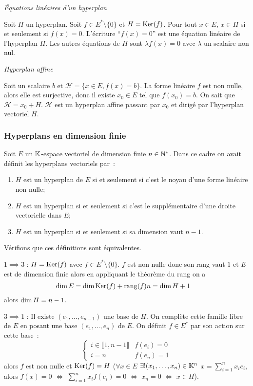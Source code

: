 \emph{Équations linéaires d'un hyperplan}

Soit \(H\) un hyperplan. Soit \(f \in E^* \setminus\{0\}\) et \(H=\operatorname{Ker}(f)\). Pour tout \(x \in E\), \(x \in H\) si et seulement si \(f(x)=0\). L'écriture ``\(f(x)=0\)'' est une équation linéaire de l'hyperplan \(H\). Les autres équations de \(H\) sont \(\lambda f(x)=0\) avec \(\lambda\) un scalaire non nul.

\emph{Hyperplan affine}

Soit un scalaire \(b\) et \(\mathcal{H}=\{x \in E, f(x)=b\}\). La forme linéaire \(f\) est non nulle, alors elle est surjective, donc il existe \(x_0 \in E\) tel que \(f(x_0)=b\). On sait que \(\mathcal{H}=x_0 + H\). \(\mathcal{H}\) est un hyperplan affine passant par \(x_0\) et dirigé par l'hyperplan vectoriel \(H\).

\subsubsection{Hyperplans en dimension finie}

Soit \(E\) un \(\mathbb{K}\)-espace vectoriel de dimension finie \(n \in \mathbb{N}^*\). Dans ce cadre on avait définit les hyperplans vectoriels par~:
\begin{enumerate}
\item \(H\) est un hyperplan de \(E\) si et seulement si c'est le noyau d'une forme linéaire non nulle;
\item \(H\) est un hyperplan si et seulement si c'est le supplémentaire d'une droite vectorielle dans \(E\);
\item \(H\) est un hyperplan si et seulement si sa dimension vaut \(n-1\).
\end{enumerate}

Vérifions que ces définitions sont équivalentes.

\(1 \implies 3\) : \(H=\operatorname{Ker}(f)\) avec \(f \in E^* \setminus\{0\}\). \(f\) est non nulle donc son rang vaut \(1\) et \(E\) est de dimension finie alors en appliquant le théorème du rang on a
\begin{align}
  \operatorname{dim} E &= \operatorname{dim} \operatorname{Ker}(f) +\operatorname{rang}(f)
  n= \operatorname{dim} H +1
\end{align}
alors \(\operatorname{dim} H = n-1\).

\(3 \implies 1\) : Il existe \((e_1, \ldots, e_{n-1})\) une base de \(H\). On complète cette famille libre de \(E\) en posant une base \((e_1, \ldots, e_{n})\) de \(E\). On définit \(f\in E^*\) par son action sur cette base~:
\begin{equation}
  \begin{cases}
    i \in \llbracket 1, n-1 \rrbracket & f(e_i)=0 \\
    i=n & f(e_n)=1
  \end{cases}
\end{equation}
alors \(f\) est non nulle et \(\operatorname{Ker}(f)=H\) (\(\forall x \in E\) \(\exists! (x_1, \ldots, x_n) \in \mathbb{K}^n\) \(x = \sum_{i=1}^n x_i e_i\), alors \(f(x)=0\) \(\iff\) \(\sum_{i=1}^n x_i f(e_i)=0\) \(\iff\) \(x_n=0\) \(\iff\) \(x \in H\)).

